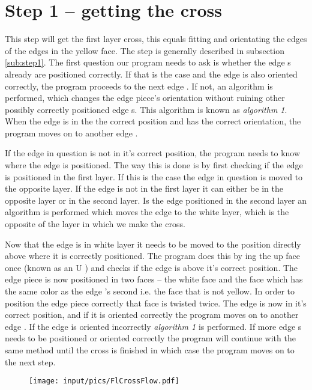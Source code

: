 \section{Step 1 -- getting the cross}
This step will get the first layer cross, this equals fitting and orientating the edges of the edges in the yellow face. 
The step is generally described in subsection \ref{sub:step1}.
The first question our program needs to ask is whether the edge \cpiece{}s already are positioned correctly. If that is the case and the edge \cpiece{} is also oriented correctly, the program proceeds to the next edge \cpiece{}. If not, an algorithm is performed, which changes the edge piece's orientation without ruining other possibly correctly positioned edge \cpiece{}s. 
This algorithm is known as \textit{algorithm 1}. When the edge \cpiece{} is in the the correct position and has the correct orientation, the program moves on to another edge \cpiece{}. 

If the edge \cpiece{} in question is not in it's correct position, the program needs to know where the edge is positioned. 
The way this is done is by first checking if the edge \cpiece{} is positioned in the first layer. 
If this is the case the edge \cpiece{} in question is moved to the opposite layer. 
If the edge \cpiece{} is not in the first layer it can either be in the opposite layer or in the second layer.
Is the edge \cpiece{}  positioned in the second layer an algorithm is performed which moves the edge \cpiece{}  to the white layer, which is the opposite of the layer in which we make the cross.

Now that the edge \cpiece{}  is in white layer it needs to be moved to the position directly above where it is correctly positioned. 
The program does this by \twist{}ing the up face once (known as an U \twist{}) and checks if the edge \cpiece{} is above it's correct position.
The edge piece is now positioned in two faces -- the white face and the face which has the same color as the edge  \cpiece{}'s second \facelet{} i.e. the face that is not yellow.
In order to position the edge piece correctly that face is twisted twice.
The edge \cpiece{}  is now in it's correct position, and if it is oriented correctly the program moves on to another edge  \cpiece{} .
If the edge \cpiece{} is oriented incorrectly \textit{algorithm 1} is performed. If more edge  \cpiece{}s needs to be positioned or oriented correctly the program will continue with the same method until the cross is finished in which case the program moves on to the next step.

\begin{figure}[htbp]
	\centering
		\texttt{[image: input/pics/FlCrossFlow.pdf]}
	\label{fig:FlCrossFlow}
\end{figure}

